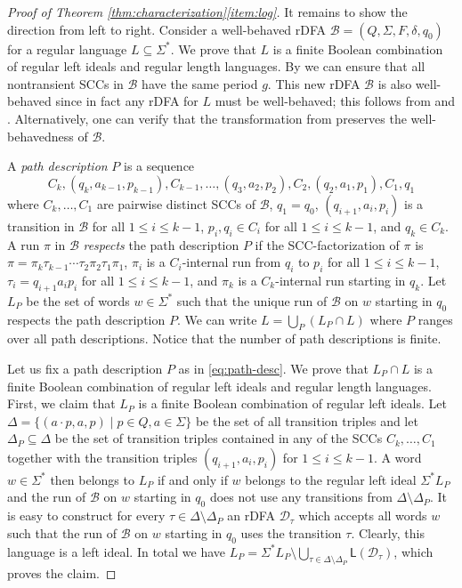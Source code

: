 \documentclass{theoretics}
\newcommand{\B}{\mathcal{B}}
\renewcommand{\L}{\mathsf{L}}
\renewcommand{\leq}{\leqslant}
\renewcommand{\le}{\leq}
\begin{document}
\begin{proof}[Proof of Theorem \ref{thm:characterization}\ref{item:log}]
It remains to show the direction from left to right.
Consider a well-behaved rDFA $\B = (Q,\Sigma,F,\delta,q_0)$
for a regular language $L \subseteq \Sigma^*$.
We prove that $L$ is a finite Boolean combination of regular left ideals
and regular length languages.
By  we can ensure that all nontransient SCCs in $\B$
have the same period $g$.
This new rDFA $\B$ is also well-behaved since in fact any rDFA for $L$ must be well-behaved; this follows from 
 and .
Alternatively, one can verify that the transformation from  preserves the well-behavedness of $\B$.

A {\em path description} $P$ is a sequence
\begin{equation}
	\label{eq:path-desc}
	C_k,(q_k,a_{k-1},p_{k-1}),C_{k-1}, \dots ,(q_3,a_2,p_2),C_2,(q_2,a_1,p_1),C_1,q_1
\end{equation}
where $C_k, \dots, C_1$ are pairwise distinct SCCs of $\B$,
$q_1 = q_0$,
$(q_{i+1},a_i,p_i)$ is a transition in $\B$ for all $1 \le i \le k-1$,
$p_i, q_i \in C_i$ for all $1 \le i \le k-1$, and $q_k \in C_k$.
A run $\pi$ in $\B$ {\em respects} the path description $P$ if the SCC-factorization of $\pi$ is
$\pi = \pi_k \tau_{k-1} \cdots \tau_2 \pi_2 \tau_1 \pi_1$,
$\pi_i$ is a $C_i$-internal run from $q_i$ to $p_i$ for all $1 \le i \le k-1$,
$\tau_i = q_{i+1} a_i p_i$ for all $1 \le i \le k-1$,
and $\pi_k$ is a $C_k$-internal run starting in $q_k$.
Let $L_P$ be the set of words $w \in \Sigma^*$ such that the unique run of $\B$ on $w$
starting in $q_0$ respects the path description $P$.
We can write $L = \bigcup_P (L_P \cap L)$ where $P$ ranges over all path descriptions.
Notice that the number of path descriptions is finite.

Let us fix a path description $P$ as in \eqref{eq:path-desc}. We prove that $L_P \cap L$ is a finite Boolean combination of regular left ideals and regular length languages.
First, we claim that $L_P$ is a finite Boolean combination of regular left ideals.
Let $\Delta = \{ (a \cdot p,a,p) \mid p \in Q, a \in \Sigma \}$ be the set of all transition triples
and let $\Delta_P \subseteq \Delta$ be the set of transition triples contained in any of the SCCs $C_k, \dots, C_1$
together with the transition triples $(q_{i+1},a_i,p_i)$ for $1 \le i \le k-1$.
A word $w \in \Sigma^*$ then belongs to $L_P$ if and only if
$w$ belongs to the regular left ideal $\Sigma^* L_P$ and the run of $\B$ on $w$ starting in $q_0$
does not use any transitions from $\Delta \setminus \Delta_P$.
It is easy to construct for every  $\tau \in \Delta \setminus \Delta_P$
an rDFA $\mathcal{D}_\tau$ which accepts all words $w$ such that the run of $\B$ on $w$ starting in $q_0$
uses the transition $\tau$. Clearly, this language is a left ideal.
In total we have $L_P = \Sigma^* L_P \setminus \bigcup_{\tau \in \Delta \setminus \Delta_P} \L(\mathcal{D}_\tau)$,
which proves the claim.


\end{proof}
\end{document}
